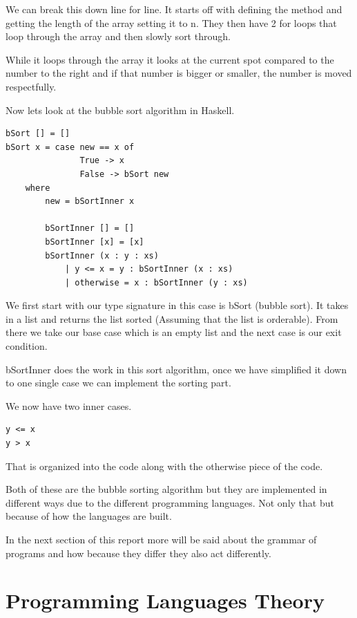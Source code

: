\documentclass{article}
\begin{document}
\medskip\noindent
We can break this down line for line. It starts off with defining the method and getting the length of the array setting it to n. They then have 2 for loops that loop through the array and then slowly sort through. 

\medskip\noindent
While it loops through the array it looks at the current spot compared to the number to the right and if that number is bigger or smaller, the number is moved respectfully. 

\medskip\noindent
Now lets look at the bubble sort algorithm in Haskell. 

\medskip\noindent
\begin{lstlisting}
bSort [] = []
bSort x = case new == x of
               True -> x
               False -> bSort new
    where
        new = bSortInner x

        bSortInner [] = []  
        bSortInner [x] = [x]
        bSortInner (x : y : xs)
            | y <= x = y : bSortInner (x : xs)
            | otherwise = x : bSortInner (y : xs)
\end{lstlisting}
\cite{BSH}

\medskip\noindent
We first start with our type signature in this case is bSort (bubble sort). It takes in a list and returns the list sorted (Assuming that the list is orderable). From there we take our base case which is an empty list and the next case is our exit condition. 

\medskip\noindent
bSortInner does the work in this sort algorithm, once we have simplified it down to one single case we can implement the sorting part. 

\medskip\noindent
We now have two inner cases. 

\medskip\noindent
\begin{lstlisting}
y <= x 
y > x
\end{lstlisting}

\medskip\noindent
That is organized into the code along with the otherwise piece of the code.

\medskip\noindent
Both of these are the bubble sorting algorithm but they are implemented in different ways due to the different programming languages. Not only that but because of how the languages are built. 

\medskip\noindent
In the next section of this report more will be said about the grammar of programs and how because they differ they also act differently.

\section{Programming Languages Theory}
\end{document}
